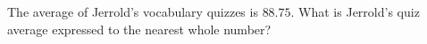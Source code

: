 The average of Jerrold's vocabulary quizzes is $88.75$. What is Jerrold's quiz average expressed to the nearest whole number?

